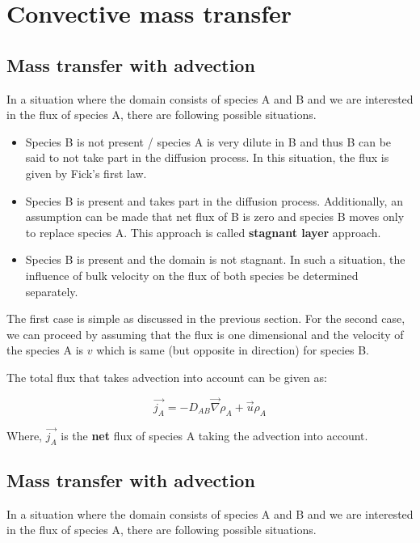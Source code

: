 \chapter{Convective mass transfer}

\section{Mass transfer with advection}

In a situation where the domain consists of species A and B and we are
interested in the flux of species A, there are following possible situations.

\begin{itemize}
\item Species B is not present / species A is very dilute in B and thus B can be
said to not take part in the diffusion process. In this situation, the flux is
given by Fick's first law.
\item Species B is present and takes part in the diffusion process.
Additionally, an assumption can be made that net flux of B is zero and species B
moves only to replace species A. This approach is called \textbf{stagnant layer}
approach.
\item Species B is present and the domain is not stagnant. In such a situation,
the influence of bulk velocity on the flux of both species be determined
separately.
\end{itemize}

The first case is simple as discussed in the previous section. For the second
case, we can proceed by assuming that the flux is one dimensional and the
velocity of the species A is $v$ which is same (but opposite in direction) for
species B. 

The total flux that takes advection into account can be
given as:

$$ \boxed{
 \vec{j_A} = -D_{AB}\vec{\nabla} \rho_A + \vec{u} \rho_A 
}$$

Where, $\vec{j_A}$ is the \textbf{net} flux of species A taking the advection
into account.

\section{Mass transfer with advection}

In a situation where the domain consists of species A and B and we are
interested in the flux of species A, there are following possible situations.

